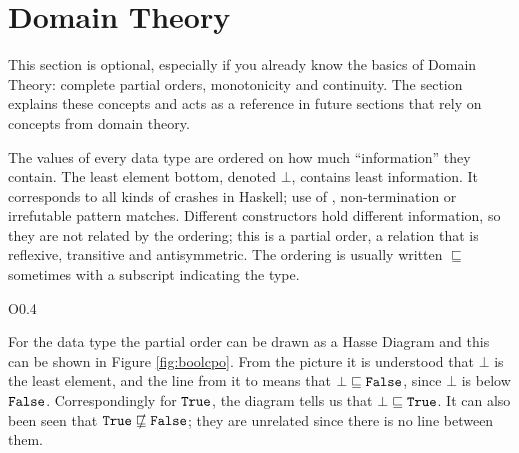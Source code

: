 \section{Domain Theory}


This section is optional, especially if you already know the basics of
Domain Theory: comp\-lete partial orders, monotonicity and
continuity.
The section explains these concepts and acts as a reference in future
sections that rely on concepts from domain theory.

The values of every data type are ordered on how much ``information''
they contain. The least element bottom, denoted $\bot$, contains least
information. It corresponds to all kinds of crashes in Haskell; use of
, non-termination or irrefutable pattern matches.
Different constructors hold different information, so they are not
related by the ordering; this is a partial order, a relation that is
reflexive, transitive and antisymmetric. The ordering is usually
written $\sqsubseteq$ sometimes with a subscript indicating the type.

\begin{wrapfigure}{O}{0.4\textwidth} %
\vspace{-7pt}
\centering 
\vspace{-7pt}
\caption{
    The order of Bool values.
    \label{fig:boolcpo}
}
\end{wrapfigure}
For the  data type the partial order can be drawn as a Hasse
Diagram and this can be shown in Figure \ref{fig:boolcpo}.  From the
picture it is understood that $\bot$ is the least element, and the
line from it to  means that $\bot \sqsubseteq \hs{False}$,
since $\bot$ is below $\hs{False}$. Correspondingly for $\hs{True}$,
the diagram tells us that $\bot \sqsubseteq \hs{True}$. It can also
been seen that $\hs{True} \nsqsubseteq \hs{False}$; they are unrelated
since there is no line between them.

%


